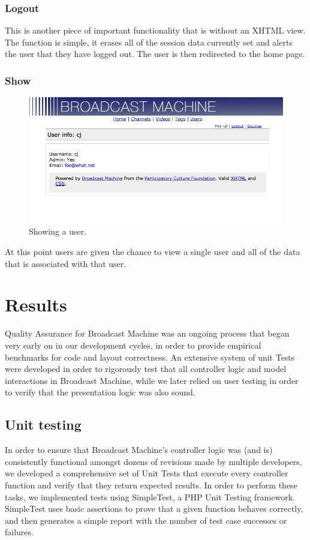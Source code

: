 \documentclass[a4paper,12pt]{report}
\begin{document}
\subsection{Logout}
This is another piece of important functionality that is without an XHTML view.
The function is simple, it erases all of the session data currently set and alerts the user that they have logged out.
The user is then redirected to the home page.

\subsection{Show}
\begin{figure}[h]
\begin{center}
\includegraphics[width=150mm]{./images/usershow.png}
\end{center}
\caption{Showing a user.}
\end{figure}
At this point users are given the chance to view a single user and all of the data that is associated with that user.
\chapter{Results}

Quality Assurance for Broadcast Machine was an ongoing process that began very early on in our development cycles, in order to provide empirical benchmarks for code and layout correctness. An extensive system of unit Tests were developed in order to rigorously test that all controller logic and model interactions in Broadcast Machine, while we later relied on user testing in order to verify that the presentation logic was also sound.

\section{Unit testing}
In order to ensure that Broadcast Machine's controller logic was (and is) consistently functional amongst dozens of revisions made by multiple developers, we developed a comprehensive set of Unit Tests that execute every controller function and verify that they return expected results. In order to perform these tasks, we implemented tests using SimpleTest, a PHP Unit Testing framework. SimpleTest uses basic assertions to prove that a given function behaves correctly, and then generates a simple report with the number of test case successes or failures.
\end{document}
